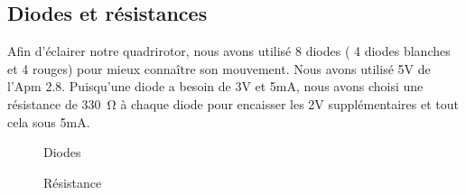 	\subsection {Diodes  et résistances}
	Afin d'éclairer notre quadrirotor, nous avons utilisé 8 diodes ( 4 diodes blanches et 4  rouges) pour mieux connaître son mouvement. Nous avons utilisé 5V de l'Apm 2.8. Puisqu'une diode a besoin de 3V et 5mA, nous avons choisi une résistance de \SI{330}{\ohm} à chaque diode pour encaisser les 2V supplémentaires et tout cela sous 5mA.
	\begin{figure}[H]
		\centering
		\begin{minipage}{0.49\textwidth}
			\hspace*{-0.7cm}
		\centering
			\caption{Diodes}
			\label{fig:my_label}
		\end{minipage}
		\begin{minipage}{0.49\textwidth}
		\hspace*{0.2cm}	
		\centering
			\caption{Résistance}
		\label{fig:my_label}
		\end{minipage}
	\end{figure}

